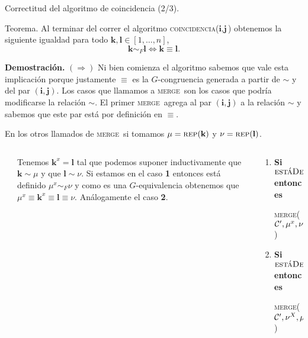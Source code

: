 \documentclass[aspectratio=169, 9pt]{beamer}
\newcommand{\rep}{\textsc{rep}}
\newcommand{\coin}{\textsc{coincidencia}}
\newcommand{\mer}{\textsc{merge}}
\newcommand{\edeff}{\textsc{estáDefinido}}
\newcommand{\Co}{{\cal{C}}}
\begin{document}
\begin{frame}[fragile]{Correctitud del algoritmo de coincidencia (2/3).}
	\begin{alertblock}{Teorema.}
		Al terminar del correr el algoritmo \coin($\textbf{i}, \textbf{j}$) obtenemos la siguiente igualdad para todo $\textbf{k}, \textbf{l} \in [1,\dots,n]$,
		\begin{equation*}
			\textbf{k} \sim_F \textbf{l} \iff \textbf{k} \equiv \textbf{l}.
		\end{equation*}
	\end{alertblock}
	\pause 
	
	\textbf{Demostración.} $(\Rightarrow)$
	\pause
	Ni bien comienza el algoritmo sabemos que vale esta implicación porque justamente $\equiv$ es la $G$-congruencia generada a partir de $\sim$ y del par $(\textbf{i}, \textbf{j})$.
	\pause
	Los casos que llamamos a \mer \ son los casos que podría modificarse la relación $\sim$.
	El primer \mer \ agrega al par $(\textbf{i}, \textbf{j})$ a la relación $\sim$ y sabemos que este par está por definición en $\equiv$.
	\pause
	
	
	En los otros llamados de \mer \ si tomamos $\mu = \rep(\textbf{k}) $ y $\nu = \rep(\textbf{l})$.
	\medskip
	\pause
	\begin{columns}
		\begin{column}{0.1\textwidth}
			
		\end{column}
		\begin{column}{0.6\textwidth}
			\begin{center}
				{ Tenemos $\textbf{k}^x = \textbf{l}$ tal que podemos suponer inductivamente que $\textbf{k} \sim \mu$ y que $\textbf{l} \sim \nu $.
				Si estamos en el caso \textbf{1} entonces está definido $\mu^x \sim_F \nu$ y como es una $G$-equivalencia obtenemos que $\mu^x \equiv \textbf{k}^x \equiv \textbf{l} \equiv \nu$. 
				Análogamente el caso \textbf{2}.}
			\end{center} 	
		\end{column}
		\begin{column}{0.3\textwidth}
			{\small \begin{enumerate}
				\item  \textbf{Si} $\edeff(\Co', \mu, x)$ \textbf{entonces}
				
				\mer($\Co', \mu^x, \nu, q$) 
				\item  \textbf{Si} $\edeff(\Co', \nu, X)$  \textbf{entonces}
				
				\mer($\Co', \nu^X, \mu, q$)
			\end{enumerate}}
		\end{column}
	\end{columns}
\end{frame}
\end{document}

